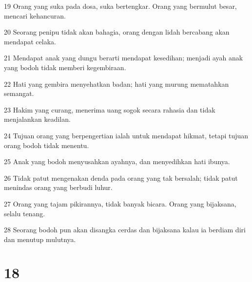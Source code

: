 \par 19 Orang yang suka pada dosa, suka bertengkar. Orang yang bermulut besar, mencari kehancuran.
\par 20 Seorang penipu tidak akan bahagia, orang dengan lidah bercabang akan mendapat celaka.
\par 21 Mendapat anak yang dungu berarti mendapat kesedihan; menjadi ayah anak yang bodoh tidak memberi kegembiraan.
\par 22 Hati yang gembira menyehatkan badan; hati yang murung mematahkan semangat.
\par 23 Hakim yang curang, menerima uang sogok secara rahasia dan tidak menjalankan keadilan.
\par 24 Tujuan orang yang berpengertian ialah untuk mendapat hikmat, tetapi tujuan orang bodoh tidak menentu.
\par 25 Anak yang bodoh menyusahkan ayahnya, dan menyedihkan hati ibunya.
\par 26 Tidak patut mengenakan denda pada orang yang tak bersalah; tidak patut menindas orang yang berbudi luhur.
\par 27 Orang yang tajam pikirannya, tidak banyak bicara. Orang yang bijaksana, selalu tenang.
\par 28 Seorang bodoh pun akan disangka cerdas dan bijaksana kalau ia berdiam diri dan menutup mulutnya.

\chapter{18}

